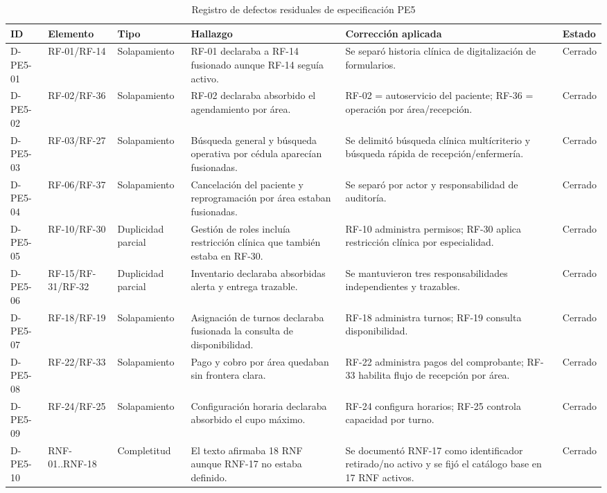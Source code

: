 \documentclass[11pt,a4paper]{article}
\begin{document}
\begin{longtable}{p{1.5cm}p{2cm}p{2.3cm}p{3.5cm}p{4.5cm}p{1.3cm}}
	\caption{Registro de defectos residuales de especificación PE5}\label{tab:defectos}\\\toprule
	\textbf{ID}&\textbf{Elemento}&\textbf{Tipo}&\textbf{Hallazgo}&\textbf{Corrección aplicada}&\textbf{Estado}\\\midrule\endhead
	D-PE5-01 & RF-01/RF-14 & Solapamiento & RF-01 declaraba a RF-14 fusionado aunque RF-14 seguía activo. & Se separó historia clínica de digitalización de formularios. & Cerrado\\
	D-PE5-02 & RF-02/RF-36 & Solapamiento & RF-02 declaraba absorbido el agendamiento por área. & RF-02 = autoservicio del paciente; RF-36 = operación por área/recepción. & Cerrado\\
	D-PE5-03 & RF-03/RF-27 & Solapamiento & Búsqueda general y búsqueda operativa por cédula aparecían fusionadas. & Se delimitó búsqueda clínica multícriterio y búsqueda rápida de recepción/enfermería. & Cerrado\\
	D-PE5-04 & RF-06/RF-37 & Solapamiento & Cancelación del paciente y reprogramación por área estaban fusionadas. & Se separó por actor y responsabilidad de auditoría. & Cerrado\\
	D-PE5-05 & RF-10/RF-30 & Duplicidad parcial & Gestión de roles incluía restricción clínica que también estaba en RF-30. & RF-10 administra permisos; RF-30 aplica restricción clínica por especialidad. & Cerrado\\
	D-PE5-06 & RF-15/RF-31/RF-32 & Duplicidad parcial & Inventario declaraba absorbidas alerta y entrega trazable. & Se mantuvieron tres responsabilidades independientes y trazables. & Cerrado\\
	D-PE5-07 & RF-18/RF-19 & Solapamiento & Asignación de turnos declaraba fusionada la consulta de disponibilidad. & RF-18 administra turnos; RF-19 consulta disponibilidad. & Cerrado\\
	D-PE5-08 & RF-22/RF-33 & Solapamiento & Pago y cobro por área quedaban sin frontera clara. & RF-22 administra pagos del comprobante; RF-33 habilita flujo de recepción por área. & Cerrado\\
	D-PE5-09 & RF-24/RF-25 & Solapamiento & Configuración horaria declaraba absorbido el cupo máximo. & RF-24 configura horarios; RF-25 controla capacidad por turno. & Cerrado\\
	D-PE5-10 & RNF-01..RNF-18 & Completitud & El texto afirmaba 18 RNF aunque RNF-17 no estaba definido. & Se documentó RNF-17 como identificador retirado/no activo y se fijó el catálogo base en 17 RNF activos. & Cerrado\\
	\bottomrule\end{longtable}
\end{document}
